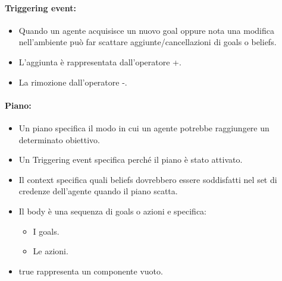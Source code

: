 



\paragraph{Triggering event:}

\begin{itemize}
  \item Quando un agente acquisisce un nuovo goal oppure nota una modifica nell'ambiente può far scattare aggiunte/cancellazioni di goals o beliefs. 
  \item L'aggiunta è rappresentata dall'operatore +. 
  \item La rimozione dall'operatore -.
\end{itemize}


\paragraph{Piano:}

\begin{itemize}
  \item Un piano specifica il modo in cui un agente potrebbe raggiungere un determinato obiettivo. 
  \item Un Triggering event specifica perché il piano è stato attivato. 
  \item Il context specifica quali beliefs dovrebbero essere soddisfatti nel set di credenze dell'agente quando il piano scatta. 
  \item Il body è una sequenza di goals o azioni e specifica:
    \begin{itemize}
      \item I goals. 
      \item Le azioni.
    \end{itemize}
  \item true rappresenta un componente vuoto.
\end{itemize} 


